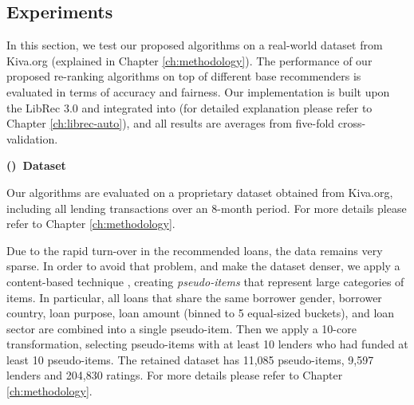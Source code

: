 \subsection{Experiments}
\label{subsect:exp}

In this section, we test our proposed algorithms on a real-world dataset from Kiva.org (explained in Chapter \ref{ch:methodology}). The performance of our proposed re-ranking algorithms on top of different base recommenders is evaluated in terms of accuracy and fairness. Our implementation is built upon the LibRec 3.0 \cite{guo2015librec} and integrated into \libauto{} (for detailed explanation please refer to Chapter \ref{ch:librec-auto}), and all results are averages from five-fold cross-validation.


\vspace{0.25cm}
\noindent \textbf{()~Dataset}
\vspace{0.25cm}

Our algorithms are evaluated on a proprietary dataset obtained from Kiva.org, including all lending transactions over an 8-month period. For more details please refer to Chapter \ref{ch:methodology}.


Due to the rapid turn-over in the recommended loans, the data remains very sparse. In order to avoid that problem, and make the dataset denser, we apply a content-based technique \cite{resnick1997recommender}, creating \textit{pseudo-items} that represent large categories of items. In particular, all loans that share the same borrower gender, borrower country, loan purpose, loan amount (binned to 5 equal-sized buckets), and loan sector are combined into a single pseudo-item. Then we apply a 10-core transformation, selecting pseudo-items with at least 10 lenders who had funded at least 10 pseudo-items. The retained dataset has 11,085 pseudo-items, 9,597 lenders and 204,830 ratings. For more details please refer to Chapter \ref{ch:methodology}.

